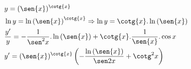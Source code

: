\begin{ex}
\begin{align}
&y=(\sen{x})^{\cotg{x}}\nonumber\\
&\ln{y}=\ln{(\sen{x})}^{\cotg{x}} \Rightarrow \ln{y}=\cotg{x}.\ln{(\sen{x})}\nonumber\\
&\frac{y'}{y}=-\frac{1}{\sen^2{x}}.\ln{(\sen{x})}+\cotg{x}.\frac{1}{\sen{x}}.\cos{x}\nonumber\\
&y'=(\sen{x})^{\cotg{x}}\left(-\frac{\ln{(\sen{x})}}{\sen2{x}}+\cotg^2{x}\right)\nonumber
\end{align}
\end{ex}